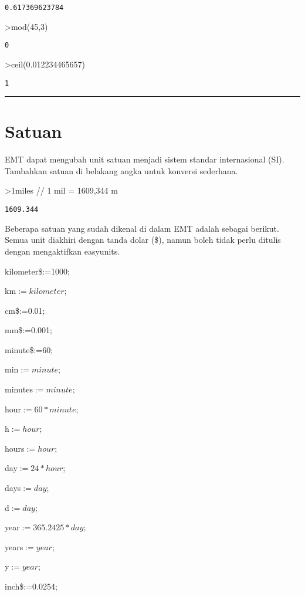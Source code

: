 \documentclass[
]{book}
\begin{document}
\begin{verbatim}
0.617369623784
\end{verbatim}

\textgreater mod(45,3)

\begin{verbatim}
0
\end{verbatim}

\textgreater ceil(0.012234465657)

\begin{verbatim}
1
\end{verbatim}

\begin{center}\rule{0.5\linewidth}{0.5pt}\end{center}

\chapter{Satuan}\label{satuan}

EMT dapat mengubah unit satuan menjadi sistem standar internasional (SI). Tambahkan satuan di belakang angka untuk konversi sederhana.

\textgreater1miles // 1 mil = 1609,344 m

\begin{verbatim}
1609.344
\end{verbatim}

Beberapa satuan yang sudah dikenal di dalam EMT adalah sebagai berikut. Semua unit diakhiri dengan tanda dolar (\$), namun boleh tidak perlu ditulis dengan mengaktifkan easyunits.

kilometer\$:=1000;

km\(:=kilometer\);

cm\$:=0.01;

mm\$:=0.001;

minute\$:=60;

min\(:=minute\);

minutes\(:=minute\);

hour\(:=60*minute\);

h\(:=hour\);

hours\(:=hour\);

day\(:=24*hour\);

days\(:=day\);

d\(:=day\);

year\(:=365.2425*day\);

years\(:=year\);

y\(:=year\);

inch\$:=0.0254;
\end{document}
